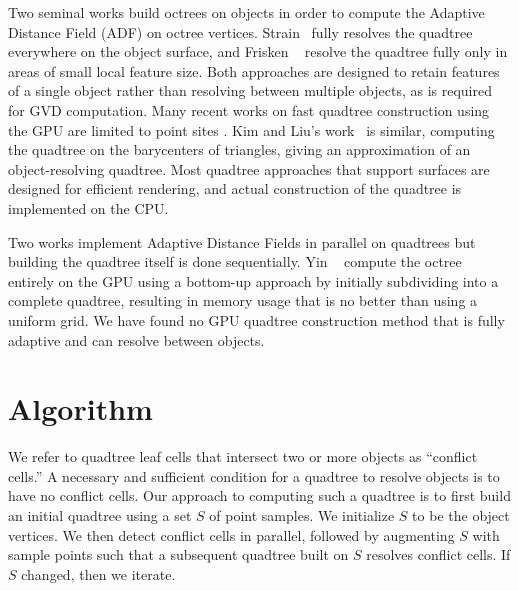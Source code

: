 \documentclass[submission]{gmp2017}
\begin{document}
Two seminal works build octrees on objects in order to compute the Adaptive Distance Field (ADF) on octree vertices.  Strain~ fully resolves the quadtree everywhere on the object surface, and Frisken \etal~ resolve the quadtree fully only in areas of small local feature size.  Both approaches are designed to retain features of a single object rather than resolving between multiple objects, as is required for GVD computation. Many recent works on fast quadtree construction using the GPU are limited to point sites \cite{bedorf2012sparse,karras2012maximizing,zhou2011data}. Kim and Liu's work~ is similar, computing the quadtree on the barycenters of triangles, giving an approximation of an object-resolving quadtree. Most quadtree approaches that support surfaces \cite{baert2013out,crassin2009gigavoxels,laine2011efficient,lefebvre2007compressed} are designed for efficient rendering, and actual construction of the quadtree is implemented on the CPU.

Two works \cite{bastos2008gpu,park2010cuda} implement Adaptive Distance Fields in parallel on quadtrees but building the quadtree itself is done sequentially.  Yin \etal~ compute the octree entirely on the GPU using a bottom-up approach by initially subdividing into a complete quadtree, resulting in memory usage that is no better than using a uniform grid. We have found no GPU quadtree construction method that is fully adaptive and can resolve between objects.

\section{Algorithm}
\label{sec:algorithm}

We refer to quadtree leaf cells that intersect two or more objects as ``conflict cells.'' A necessary and sufficient condition for a quadtree to resolve objects is to have no conflict cells. Our approach to computing such a quadtree is to first build an initial quadtree using a set $S$ of point samples. We initialize $S$ to be the object vertices. We then detect conflict cells in parallel, followed by augmenting $S$ with sample points such that a subsequent quadtree built on $S$ resolves conflict cells. If $S$ changed, then we iterate.
\end{document}
